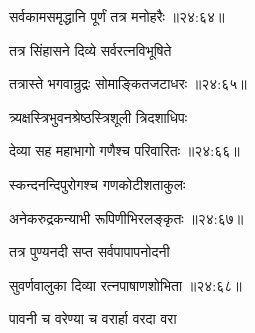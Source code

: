 {\devanagarifont सर्वकामसमृद्धानि पूर्णं तत्र मनोहरैः {॥२४:६४॥} \veg\dontdisplaylinenum }%
 
{\devanagarifont तत्र सिंहासने दिव्ये सर्वरत्नविभूषिते \thinspace{\dandab} \dontdisplaylinenum }%
 

{\devanagarifont तत्रास्ते भगवान्रुद्रः सोमाङ्कितजटाधरः {॥२४:६५॥} \veg\dontdisplaylinenum }%

{\devanagarifont त्र्यक्षस्त्रिभुवनश्रेष्ठस्त्रिशूली त्रिदशाधिपः \thinspace{\dandab} \dontdisplaylinenum }%


{\devanagarifont देव्या सह महाभागो गणैश्च परिवारितः {॥२४:६६॥} \veg\dontdisplaylinenum }%
 
{\devanagarifont स्कन्दनन्दिपुरोगश्च गणकोटीशताकुलः \thinspace{\dandab} \dontdisplaylinenum }%


{\devanagarifont अनेकरुद्रकन्याभी रूपिणीभिरलङ्कृतः {॥२४:६७॥} \veg\dontdisplaylinenum }%

{\devanagarifont तत्र पुण्यनदी सप्त सर्वपापापनोदनी \thinspace{\dandab} \dontdisplaylinenum }%
 

{\devanagarifont सुवर्णवालुका दिव्या रत्नपाषाणशोभिता {॥२४:६८॥} \veg\dontdisplaylinenum }%

{\devanagarifont पावनी च वरेण्या च वरार्हा वरदा वरा \thinspace{\dandab} \dontdisplaylinenum }%


